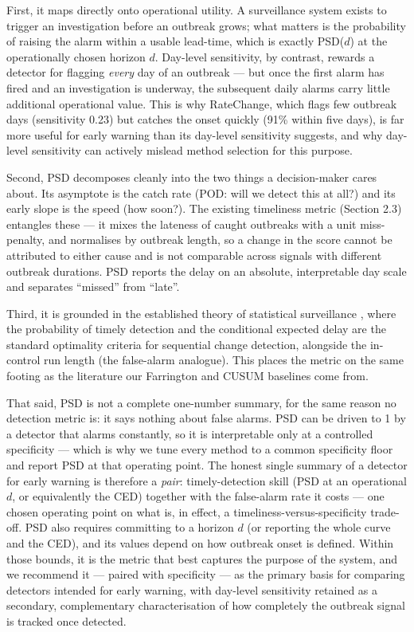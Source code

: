 \documentclass[11pt]{article}
\begin{document}
First, it maps directly onto operational utility. A surveillance system exists to trigger an investigation before an outbreak grows; what matters is the probability of raising the alarm within a usable lead-time, which is exactly PSD($d$) at the operationally chosen horizon $d$. Day-level sensitivity, by contrast, rewards a detector for flagging \textit{every} day of an outbreak --- but once the first alarm has fired and an investigation is underway, the subsequent daily alarms carry little additional operational value. This is why RateChange, which flags few outbreak days (sensitivity 0.23) but catches the onset quickly (91\% within five days), is far more useful for early warning than its day-level sensitivity suggests, and why day-level sensitivity can actively mislead method selection for this purpose.

Second, PSD decomposes cleanly into the two things a decision-maker cares about. Its asymptote is the catch rate (POD: will we detect this at all?) and its early slope is the speed (how soon?). The existing timeliness metric (Section 2.3) entangles these --- it mixes the lateness of caught outbreaks with a unit miss-penalty, and normalises by outbreak length, so a change in the score cannot be attributed to either cause and is not comparable across signals with different outbreak durations. PSD reports the delay on an absolute, interpretable day scale and separates ``missed'' from ``late''.

Third, it is grounded in the established theory of statistical surveillance \citep{frisen2003, sonesson2003}, where the probability of timely detection and the conditional expected delay are the standard optimality criteria for sequential change detection, alongside the in-control run length (the false-alarm analogue). This places the metric on the same footing as the literature our Farrington and CUSUM baselines come from.

That said, PSD is not a complete one-number summary, for the same reason no detection metric is: it says nothing about false alarms. PSD can be driven to 1 by a detector that alarms constantly, so it is interpretable only at a controlled specificity --- which is why we tune every method to a common specificity floor and report PSD at that operating point. The honest single summary of a detector for early warning is therefore a \textit{pair}: timely-detection skill (PSD at an operational $d$, or equivalently the CED) together with the false-alarm rate it costs --- one chosen operating point on what is, in effect, a timeliness-versus-specificity trade-off. PSD also requires committing to a horizon $d$ (or reporting the whole curve and the CED), and its values depend on how outbreak onset is defined. Within those bounds, it is the metric that best captures the purpose of the system, and we recommend it --- paired with specificity --- as the primary basis for comparing detectors intended for early warning, with day-level sensitivity retained as a secondary, complementary characterisation of how completely the outbreak signal is tracked once detected.
\end{document}

